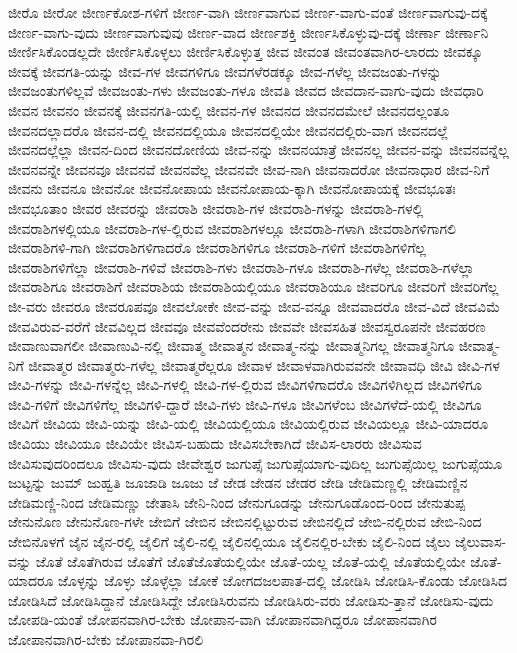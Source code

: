 {ಜೀರೊ
ಜೀರೋ
ಜೀರ್ಣಕೋಶ-ಗಳಿಗೆ
ಜೀರ್ಣ-ವಾಗಿ
ಜೀರ್ಣವಾಗುವ
ಜೀರ್ಣ-ವಾಗು-ವಂತೆ
ಜೀರ್ಣವಾಗುವು-ದಕ್ಕೆ
ಜೀರ್ಣ-ವಾಗು-ವುದು
ಜೀರ್ಣವಾಗುವುವು
ಜೀರ್ಣ-ವಾದ
ಜೀರ್ಣಶಕ್ತಿ
ಜೀರ್ಣಸಿಕೊಳ್ಳುವು-ದಕ್ಕೆ
ಜೀರ್ಣಾ
ಜೀರ್ಣಾನಿ
ಜೀರ್ಣಿಸಿಕೊಂಡಲ್ಲದೇ
ಜೀರ್ಣಿಸಿಕೊಳ್ಳಲು
ಜೀರ್ಣಿಸಿಕೊಳ್ಳುತ್ತ
ಜೀವ
ಜೀವಂತ
ಜೀವಂತವಾಗಿರ-ಲಾರದು
ಜೀವಕ್ಕೂ
ಜೀವಕ್ಕೆ
ಜೀವಗತಿ-ಯನ್ನು
ಜೀವ-ಗಳ
ಜೀವಗಳಿಗೂ
ಜೀವಗಳೆರಡಕ್ಕೂ
ಜೀವ-ಗಳೆಲ್ಲ
ಜೀವಜಂತು-ಗಳನ್ನು
ಜೀವಜಂತುಗಳಿಲ್ಲವೆ
ಜೀವಜಂತು-ಗಳು
ಜೀವಜಂತು-ಗಳೂ
ಜೀವತಿ
ಜೀವದ
ಜೀವದಾನ-ವಾಗು-ವುದು
ಜೀವಧಾರಿ
ಜೀವನ
ಜೀವನಂ
ಜೀವನಕ್ಕೆ
ಜೀವನಗತಿ-ಯಲ್ಲಿ
ಜೀವನ-ಗಳ
ಜೀವನದ
ಜೀವನದಮೇಲೆ
ಜೀವನದಲ್ಲಂತೂ
ಜೀವನದಲ್ಲಾದರೊ
ಜೀವನ-ದಲ್ಲಿ
ಜೀವನದಲ್ಲಿಯೂ
ಜೀವನದಲ್ಲಿಯೇ
ಜೀವನದಲ್ಲಿರು-ವಾಗ
ಜೀವನದಲ್ಲೆ
ಜೀವನದಲ್ಲೆಲ್ಲಾ
ಜೀವನ-ದಿಂದ
ಜೀವನದೋಣಿಯ
ಜೀವ-ನನ್ನು
ಜೀವನಯಾತ್ರೆ
ಜೀವನಲ್ಲ
ಜೀವನ-ವನ್ನು
ಜೀವನವನ್ನೆಲ್ಲ
ಜೀವನವನ್ನೇ
ಜೀವನವೂ
ಜೀವನವೆ
ಜೀವನವೆಲ್ಲ
ಜೀವನವೇ
ಜೀವ-ನಾಗಿ
ಜೀವನಾದರೋ
ಜೀವನಾಧಾರ
ಜೀವ-ನಿಗೆ
ಜೀವನು
ಜೀವನೂ
ಜೀವನೋ
ಜೀವನೋಪಾಯ
ಜೀವನೋಪಾಯ-ಕ್ಕಾಗಿ
ಜೀವನೋಪಾಯಕ್ಕೆ
ಜೀವಭೂತಃ
ಜೀವಭೂತಾಂ
ಜೀವರ
ಜೀವರನ್ನು
ಜೀವರಾಶಿ
ಜೀವರಾಶಿ-ಗಳ
ಜೀವರಾಶಿ-ಗಳನ್ನು
ಜೀವರಾಶಿ-ಗಳಲ್ಲಿ
ಜೀವರಾಶಿಗಳಲ್ಲಿಯೂ
ಜೀವರಾಶಿ-ಗಳ-ಲ್ಲಿರುವ
ಜೀವರಾಶಿಗಳಲ್ಲೂ
ಜೀವರಾಶಿ-ಗಳಾಗಿ
ಜೀವರಾಶಿಗಳಿಗಾಗಲಿ
ಜೀವರಾಶಿಗಳಿ-ಗಾಗಿ
ಜೀವರಾಶಿಗಳಿಗಾದರೊ
ಜೀವರಾಶಿಗಳಿಗೂ
ಜೀವರಾಶಿ-ಗಳಿಗೆ
ಜೀವರಾಶಿಗಳಿಗೆಲ್ಲ
ಜೀವರಾಶಿಗಳಿಗೆಲ್ಲಾ
ಜೀವರಾಶಿ-ಗಳಿವೆ
ಜೀವರಾಶಿ-ಗಳು
ಜೀವರಾಶಿ-ಗಳೂ
ಜೀವರಾಶಿ-ಗಳೆಲ್ಲ
ಜೀವರಾಶಿ-ಗಳೆಲ್ಲಾ
ಜೀವರಾಶಿಗೂ
ಜೀವರಾಶಿಗೆ
ಜೀವರಾಶಿಯ
ಜೀವರಾಶಿಯಲ್ಲಿಯೂ
ಜೀವರಾಶಿಯೂ
ಜೀವರಿಗೂ
ಜೀವರಿಗೆ
ಜೀವರಿಗೆಲ್ಲ
ಜೀ-ವರು
ಜೀವರೂ
ಜೀವರೂಪವೂ
ಜೀವಲೋಕೇ
ಜೀವ-ವನ್ನು
ಜೀವ-ವನ್ನೂ
ಜೀವವಾದರೊ
ಜೀವ-ವಿದೆ
ಜೀವವಿಮೆ
ಜೀವವಿರುವ-ವರೆಗೆ
ಜೀವವಿಲ್ಲದ
ಜೀವವೂ
ಜೀವವೆಂದರೇನು
ಜೀವವೇ
ಜೀವಸಹಿತ
ಜೀವಸ್ವರೂಪನೇ
ಜೀವಹರಣ
ಜೀವಾಣುವಾಗಲೀ
ಜೀವಾಣುವಿ-ನಲ್ಲಿ
ಜೀವಾತ್ಮ
ಜೀವಾತ್ಮನ
ಜೀವಾತ್ಮ-ನನ್ನು
ಜೀವಾತ್ಮನಿಗಲ್ಲ
ಜೀವಾತ್ಮನಿಗೂ
ಜೀವಾತ್ಮ-ನಿಗೆ
ಜೀವಾತ್ಮರ
ಜೀವಾತ್ಮರು-ಗಳೆಲ್ಲ
ಜೀವಾತ್ಮರೆಲ್ಲರೂ
ಜೀವಾಳ
ಜೀವಾಳವಾಗಿರುವವನೇ
ಜೀವಾವಧಿ
ಜೀವಿ
ಜೀವಿ-ಗಳ
ಜೀವಿ-ಗಳನ್ನು
ಜೀವಿ-ಗಳನ್ನೆಲ್ಲ
ಜೀವಿ-ಗಳಲ್ಲಿ
ಜೀವಿ-ಗಳ-ಲ್ಲಿರುವ
ಜೀವಿಗಳಿಗಾದರೊ
ಜೀವಿಗಳಿಗಿಲ್ಲದ
ಜೀವಿಗಳಿಗೂ
ಜೀವಿ-ಗಳಿಗೆ
ಜೀವಿಗಳಿಗೆಲ್ಲ
ಜೀವಿಗಳಿ-ದ್ದಾರೆ
ಜೀವಿ-ಗಳು
ಜೀವಿ-ಗಳೂ
ಜೀವಿಗಳೆಂಬ
ಜೀವಿಗಳೆದೆ-ಯಲ್ಲಿ
ಜೀವಿಗೂ
ಜೀವಿಗೆ
ಜೀವಿಯ
ಜೀವಿ-ಯನ್ನು
ಜೀವಿ-ಯಲ್ಲಿ
ಜೀವಿಯಲ್ಲಿಯೂ
ಜೀವಿಯಲ್ಲಿರುವ
ಜೀವಿಯಲ್ಲೂ
ಜೀವಿ-ಯಾದರೂ
ಜೀವಿಯು
ಜೀವಿಯೂ
ಜೀವಿಯೇ
ಜೀವಿಸ-ಬಹುದು
ಜೀವಿಸಬೇಕಾಗಿದೆ
ಜೀವಿಸ-ಲಾರರು
ಜೀವಿಸುವ
ಜೀವಿಸುವುದರಿಂದಲೂ
ಜೀವಿಸು-ವುದು
ಜೀವೇಶ್ವರ
ಜುಗುಪ್ಸೆ
ಜುಗುಪ್ಸೆಯಾಗು-ವುದಿಲ್ಲ
ಜುಗುಪ್ಸೆಯಿಲ್ಲ
ಜುಗುಪ್ಸೆಯೂ
ಜುಟ್ಟನ್ನು
ಜುಮ್
ಜುಹ್ವತಿ
ಜೂಜಾಡಿ
ಜೂಜು
ಜೆ
ಜೇಡ
ಜೇಡನ
ಜೇಡರ
ಜೇಡಿ
ಜೇಡಿಮಣ್ಣಲ್ಲಿ
ಜೇಡಿಮಣ್ಣಿನ
ಜೇಡಿಮಣ್ಣಿ-ನಿಂದ
ಜೇಡಿಮಣ್ಣು
ಜೇತಾಸಿ
ಜೇನಿ-ನಿಂದ
ಜೇನುಗೂಡನ್ನು
ಜೇನುಗೂಡೊಂದ-ರಿಂದ
ಜೇನುತುಪ್ಪ
ಜೇನುನೊಣ
ಜೇನುನೊಣ-ಗಳೇ
ಜೇಬಿಗೆ
ಜೇಬಿನ
ಜೇಬಿನಲ್ಲಿಟ್ಟುರುವ
ಜೇಬಿನಲ್ಲಿದೆ
ಜೇಬಿ-ನಲ್ಲಿರುವ
ಜೇಬಿ-ನಿಂದ
ಜೇಬಿನೊಳಗೆ
ಜೈನ
ಜೈನ-ರಲ್ಲಿ
ಜೈಲಿಗೆ
ಜೈಲಿ-ನಲ್ಲಿ
ಜೈಲಿನಲ್ಲಿಯೂ
ಜೈಲಿನಲ್ಲಿರ-ಬೇಕು
ಜೈಲಿ-ನಿಂದ
ಜೈಲು
ಜೈಲುವಾಸ-ವನ್ನು
ಜೊತೆ
ಜೊತೆಗಿರುವ
ಜೊತೆಗೆ
ಜೊತೆಜೊತೆಯಲ್ಲಿಯೇ
ಜೊತೆ-ಯಲ್ಲ
ಜೊತೆ-ಯಲ್ಲಿ
ಜೊತೆಯಲ್ಲಿಯೇ
ಜೊತೆ-ಯಾದರೂ
ಜೊಳ್ಳನ್ನು
ಜೊಳ್ಳು
ಜೊಳ್ಳೆಲ್ಲಾ
ಜೋಕೆ
ಜೋಗದಜಲಪಾತ-ದಲ್ಲಿ
ಜೋಡಿಸಿ
ಜೋಡಿಸಿ-ಕೊಂಡು
ಜೋಡಿಸಿದ
ಜೋಡಿಸಿದೆ
ಜೋಡಿಸಿದ್ದಾನೆ
ಜೋಡಿಸಿದ್ದೇ
ಜೋಡಿಸಿರುವನು
ಜೋಡಿಸಿರು-ವರು
ಜೋಡಿಸು-ತ್ತಾನೆ
ಜೋಡಿಸು-ವುದು
ಜೋಪಡಿ-ಯಂತೆ
ಜೋಪನವಾಗಿರ-ಬೇಕು
ಜೋಪಾನ-ವಾಗಿ
ಜೋಪಾನವಾಗಿದ್ದರೂ
ಜೋಪಾನವಾಗಿರ
ಜೋಪಾನವಾಗಿರ-ಬೇಕು
ಜೋಪಾನವಾ-ಗಿರಲಿ
}

